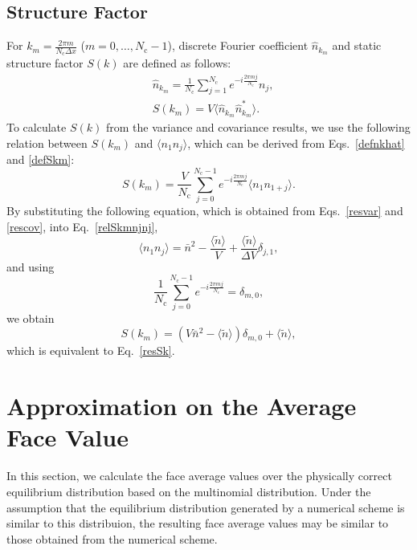 \documentclass{article}
\newcommand{\dx}{{\Delta x}}
\newcommand{\dV}{{\Delta V}}
\newcommand{\avgntilde}{{\langle\tilde{n}\rangle}}
\newcommand{\Nc}{{N_\mathrm{c}}}
\newcommand{\nb}{\bar{n}}
\begin{document}
\subsection{Structure Factor}

For $k_m=\frac{2\pi m}{\Nc\dx}$ ($m=0,\dots,\Nc-1$), discrete Fourier coefficient $\hat{n}_{k_m}$ and static structure factor $S(k)$ are defined as follows: 
\begin{align}
\label{defnkhat}
&\hat{n}_{k_m} = \frac{1}{\Nc}\sum_{j=1}^\Nc e^{-i\frac{2\pi m j}{\Nc}}n_j,\\
\label{defSkm}
&S(k_m)=V\langle \hat{n}_{k_m} \hat{n}_{k_m}^*\rangle.
\end{align}
To calculate $S(k)$ from the variance and covariance results, we use the following relation between $S(k_m)$ and $\langle n_1 n_j\rangle$, which can be derived from Eqs.~\eqref{defnkhat} and \eqref{defSkm}:
\begin{equation}
\label{relSkmnjnj}
S(k_m)=\frac{V}{\Nc}\sum_{j=0}^{\Nc-1}e^{-i\frac{2\pi m j}{\Nc}}\langle n_1 n_{1+j}\rangle.
\end{equation}
By substituting the following equation, which is obtained from Eqs.~\eqref{resvar} and \eqref{rescov}, into Eq.~\eqref{relSkmnjnj},
\begin{equation}
\langle n_1 n_j \rangle = \nb^2-\frac{\avgntilde}{V}+\frac{\avgntilde}{\dV}\delta_{j,1},
\end{equation}
and using
\begin{equation}
\frac{1}{\Nc}\sum_{j=0}^{\Nc-1}e^{-i \frac{2\pi m j}{\Nc}}=\delta_{m,0},
\end{equation}
we obtain
\begin{equation}
S(k_m)=\left(V\nb^2-\avgntilde\right)\delta_{m,0}+\avgntilde,
\end{equation}
which is equivalent to Eq.~\eqref{resSk}.

\section{Approximation on the Average Face Value}

In this section, we calculate the face average values over the physically correct equilibrium distribution based on the multinomial distribution.
Under the assumption that the equilibrium distribution generated by a numerical scheme is similar to this distribuion, the resulting face average values may be similar to those obtained from the numerical scheme. 
\end{document}
